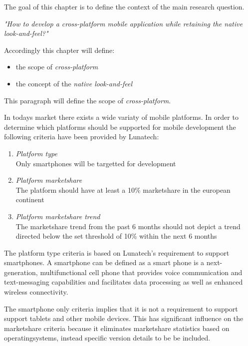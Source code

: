 The goal of this chapter is to define the context of the main research question.

\indent \emph{"How to develop a cross-platform mobile application while retaining the native look-and-feel?"}

\noindent Accordingly this chapter will define:
\begin{itemize}
\item the scope of \emph{cross-platform}
\item the concept of the \emph{native look-and-feel}
\end{itemize}


This paragraph will define the scope of \emph{cross-platform}.


In todays market there exists a wide variaty of mobile platforms. In order to determine which platforms should be supported for mobile development the following criteria have been provided by Lunatech:

\begin{enumerate}
\item \emph{Platform type}\\
Only smartphones will be targetted for development
\item \emph{Platform marketshare}\\
The platform should have at least a 10\% marketshare in the european continent
\item \emph{Platform marketshare trend}\\
The marketshare trend from the past 6 months should not depict a trend directed below the set threshold of 10\% within the next 6 months
\end{enumerate}

The platform type criteria is based on Lunatech's requirement to support smartphones. A smartphone can be defined as a smart phone is a next-generation, multifunctional cell phone that provides voice communication and text-messaging capabilities and facilitates data processing as well as enhanced wireless connectivity.\cite{Ni2006}

The smartphone only criteria implies that it is not a requirement to support support tablets and other mobile devices. This has significant influence on the marketshare criteria because it eliminates marketshare statistics based on operatingsystems, instead specific version details to be be included. %

